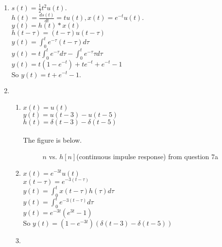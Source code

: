 \documentclass[10pt,a4paper, margin=1in]{article}
\begin{document}
\begin{enumerate}
\begin{enumerate}
    \end{enumerate}

\item %
\(s(t) = \frac{1}{2}t^{2}u(t).\)\\
\(h(t) = \frac{ds(t)}{dt} = tu(t),x(t) = e^{-t}u(t) .\)\\
\(y(t) = h(t) \ast x(t)\)\\
\(h(t-\tau) = (t-\tau)u(t-\tau)\)\\
\(y(t) = \int_{0}^{t}e^{-\tau}(t-\tau)d\tau\)\\
\(y(t) = t\int_{0}^{t}e^{-\tau}d\tau - \int_{0}^{t}e^{-\tau}\tau d\tau \)\\
\(y(t) = t(1-e^{-t}) + te^{-t} + e^{-t} -1\)\\
So \(y(t) = t + e^{-t} -1.\)
\item %
    \begin{enumerate}
    \item %
    \(x(t) = u(t) \)\\
    \(y(t) = u(t-3) - u(t-5)\)\\
    \(h(t) =  \delta(t-3)-\delta(t-5)\)\\ \\
    The figure is below.
    \begin{figure} [ht!]
        \centering
        \caption{$n$ vs. $h[n]$(continuous impulse response) from question 7a}
        \label{fig:q7}
    \end{figure}
    \item %
    \(x(t) = e^{-3t}u(t)\)\\
    \(x(t-\tau) = e^{-3(t-\tau)}\)\\
    \(y(t) = \int_{0}^{t}x(t-\tau)h(\tau)d\tau\)\\
    \(y(t) = \int_{0}^{t}e^{-3(t-\tau)}d\tau\)\\
    \(y(t) = e^{-3t}(e^{3t}-1)\)\\
    So \(y(t) = (1-e^{-3t})(\delta(t-3)-\delta(t-5))\)
    \item %
    \end{enumerate}    

\end{enumerate}
\end{document}
